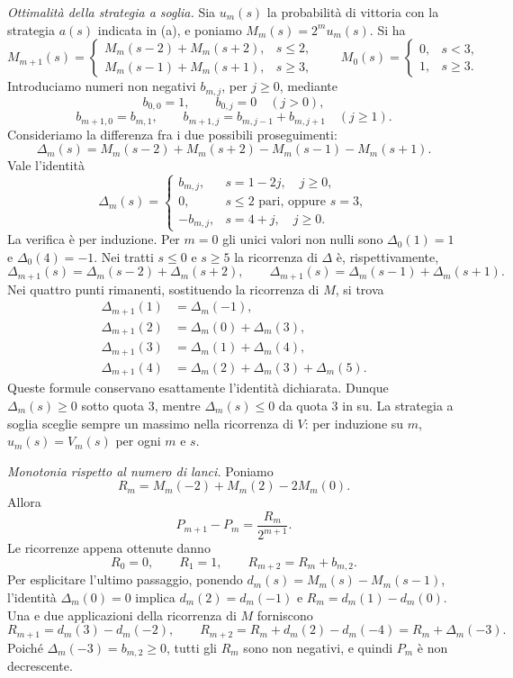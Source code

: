 {\emph{Ottimalit\`a della strategia a soglia.}
Sia $u_m(s)$ la probabilit\`a di vittoria con la strategia $a(s)$
indicata in (a), e poniamo $M_m(s)=2^m u_m(s)$. Si ha
\[
 M_{m+1}(s)=
 \begin{cases}
 M_m(s-2)+M_m(s+2),&s\leq2,\\
 M_m(s-1)+M_m(s+1),&s\geq3,
 \end{cases}
 \qquad M_0(s)=\begin{cases}0,&s<3,\\1,&s\geq3.\end{cases}
\]
Introduciamo numeri non negativi $b_{m,j}$, per $j\geq0$, mediante
\[
 b_{0,0}=1,\qquad b_{0,j}=0\quad(j>0),
\]
\[
 b_{m+1,0}=b_{m,1},\qquad
 b_{m+1,j}=b_{m,j-1}+b_{m,j+1}\quad(j\geq1).
\]
Consideriamo la differenza fra i due possibili proseguimenti:
\[
 \Delta_m(s)=M_m(s-2)+M_m(s+2)-M_m(s-1)-M_m(s+1).
\]
Vale l'identit\`a
\[
 \Delta_m(s)=
 \begin{cases}
 b_{m,j},&s=1-2j,\quad j\geq0,\\
 0,&s\leq2\text{ pari, oppure }s=3,\\
 -b_{m,j},&s=4+j,\quad j\geq0.
 \end{cases}
\]
La verifica \`e per induzione. Per $m=0$ gli unici valori non nulli
sono $\Delta_0(1)=1$ e $\Delta_0(4)=-1$. Nei tratti $s\leq0$ e $s\geq5$
la ricorrenza di $\Delta$ \`e, rispettivamente,
\[
 \Delta_{m+1}(s)=\Delta_m(s-2)+\Delta_m(s+2),\qquad
 \Delta_{m+1}(s)=\Delta_m(s-1)+\Delta_m(s+1).
\]
Nei quattro punti rimanenti, sostituendo la ricorrenza di $M$, si trova
\[
\begin{aligned}
 \Delta_{m+1}(1)&=\Delta_m(-1),\\
 \Delta_{m+1}(2)&=\Delta_m(0)+\Delta_m(3),\\
 \Delta_{m+1}(3)&=\Delta_m(1)+\Delta_m(4),\\
 \Delta_{m+1}(4)&=\Delta_m(2)+\Delta_m(3)+\Delta_m(5).
\end{aligned}
\]
Queste formule conservano esattamente l'identit\`a dichiarata.
Dunque $\Delta_m(s)\geq0$ sotto quota $3$, mentre
$\Delta_m(s)\leq0$ da quota $3$ in su. La strategia a soglia sceglie
sempre un massimo nella ricorrenza di $V$: per induzione su $m$,
$u_m(s)=V_m(s)$ per ogni $m$ e $s$.

\emph{Monotonia rispetto al numero di lanci.}
Poniamo
\[
 R_m=M_m(-2)+M_m(2)-2M_m(0).
\]
Allora
\[
 P_{m+1}-P_m=\frac{R_m}{2^{m+1}}.
\]
Le ricorrenze appena ottenute danno
\[
 R_0=0,\qquad R_1=1,\qquad R_{m+2}=R_m+b_{m,2}.
\]
Per esplicitare l'ultimo passaggio, ponendo
$d_m(s)=M_m(s)-M_m(s-1)$, l'identit\`a $\Delta_m(0)=0$ implica
$d_m(2)=d_m(-1)$ e $R_m=d_m(1)-d_m(0)$. Una e due applicazioni
della ricorrenza di $M$ forniscono
\[
 R_{m+1}=d_m(3)-d_m(-2),\qquad
 R_{m+2}=R_m+d_m(2)-d_m(-4)
        =R_m+\Delta_m(-3).
\]
Poich\'e $\Delta_m(-3)=b_{m,2}\geq0$, tutti gli $R_m$ sono non negativi,
e quindi $P_m$ \`e non decrescente.

}
